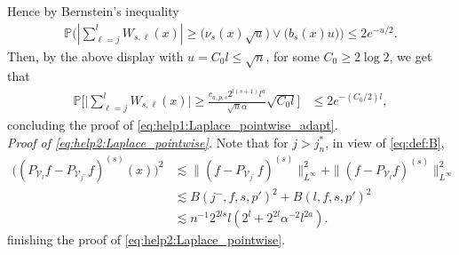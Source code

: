 \documentclass[preprint]{imsart}
\renewcommand{\P}{\mathbb{P}}
\numberwithin{equation}{section}
\begin{document}
\begin{appendix}
 Hence by Bernstein's inequality
\begin{align}
\P\Big(|\sum_{\ell=j}^{l}  W_{s,\ell}(x)|\geq  \big(\nu_{s}(x)\sqrt{u} \big)  \vee  \big(b_{s}(x)u\big)\Big)\leq 2e^{-u/2}.\label{eq:bernstein}
\end{align}
Then, by the above display with $u=C_0l\leq\sqrt{n}$, for some $C_0\geq 2\log 2$, we get that
\begin{align}
\P\Big[ \Big|\sum_{\ell=j}^{l} W_{s,\ell}(x)\Big|\geq \frac{c_{a,p,s} 2^{l(s+1)} l^{a}}{\sqrt{n}\alpha}\sqrt{C_0l}  \Big]
&\le 2 e^{-(C_0/2)l},\label{eq:UB:W:pointwise}
\end{align}
concluding the proof of  \eqref{eq:help1:Laplace_pointwise_adapt}.\\



\textit{Proof of \eqref{eq:help2:Laplace_pointwise}.} Note that for $j>j_n^*$, in view of \eqref{eq:def:B},
\begin{align*}
\big( (P_{\mathcal{V}_{l}}f- P_{\mathcal{V}_{j^-}}f)^{(s)}(x)\big)^2 &\lesssim \|(f-   P_{\mathcal{V}_{j^{-}}}f)^{(s)}\|_{L^\infty}^2+ \|(f-  P_{\mathcal{V}_l}f)^{(s)}\|_{L^\infty}^2\\
&\lesssim B(j^{-},f,s,p')^2+B(l,f,s,p')^2\\
& \lesssim n^{-1}2^{2ls}l(2^{l}+2^{2l}\alpha^{-2}l^{2a}).%
\end{align*}
finishing the proof of  \eqref{eq:help2:Laplace_pointwise}.\\






\end{appendix}
\end{document}
